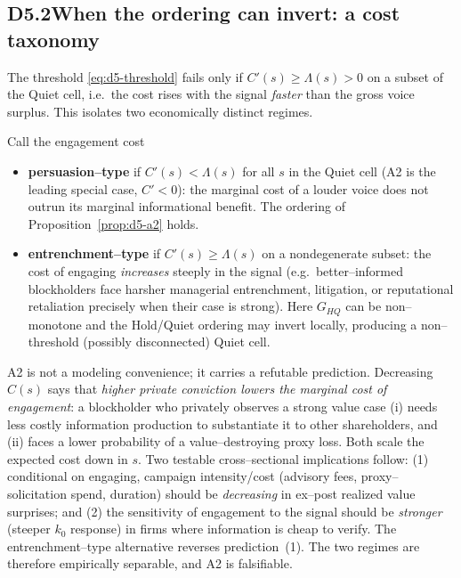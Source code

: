 \subsection*{D5.2\quad When the ordering can invert: a cost taxonomy}

The threshold \eqref{eq:d5-threshold} fails only if $C'(s)\ge\Lambda(s)>0$ on a
subset of the Quiet cell, i.e.\ the cost rises with the signal \emph{faster}
than the gross voice surplus. This isolates two economically distinct regimes.

\begin{definition}\label{def:d5-regimes}
Call the engagement cost
\begin{itemize}
\item \textbf{persuasion--type} if $C'(s)<\Lambda(s)$ for all $s$ in the Quiet
cell (A2 is the leading special case, $C'<0$): the marginal cost of a louder
voice does not outrun its marginal informational benefit. The ordering of
Proposition~\ref{prop:d5-a2} holds.
\item \textbf{entrenchment--type} if $C'(s)\ge\Lambda(s)$ on a nondegenerate
subset: the cost of engaging \emph{increases} steeply in the signal (e.g.\
better--informed blockholders face harsher managerial entrenchment, litigation,
or reputational retaliation precisely when their case is strong). Here $G_{HQ}$
can be non--monotone and the Hold/Quiet ordering may invert locally, producing a
non--threshold (possibly disconnected) Quiet cell.
\end{itemize}
\end{definition}

\begin{remark}\label{rem:d5-mech}
A2 is not a modeling convenience; it carries a refutable prediction. Decreasing
$C(s)$ says that \emph{higher private conviction lowers the marginal cost of
engagement}: a blockholder who privately observes a strong value case (i) needs
less costly information production to substantiate it to other shareholders, and
(ii) faces a lower probability of a value--destroying proxy loss. Both scale the
expected cost down in $s$. Two testable cross--sectional implications follow:
(1) conditional on engaging, campaign intensity/cost (advisory fees,
proxy--solicitation spend, duration) should be \emph{decreasing} in ex--post
realized value surprises; and (2) the sensitivity of engagement to the signal
should be \emph{stronger} (steeper $k_0$ response) in firms where information is
cheap to verify. The entrenchment--type alternative reverses prediction~(1). The
two regimes are therefore empirically separable, and A2 is falsifiable.
\end{remark}


